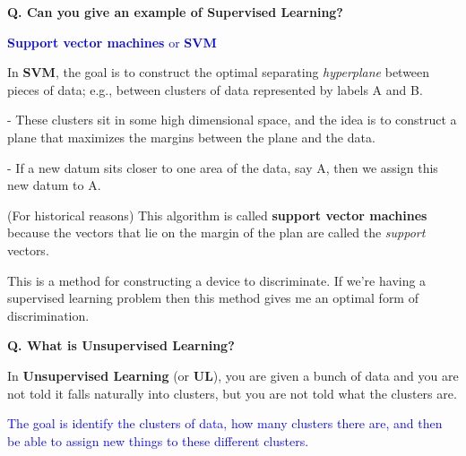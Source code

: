 \begin{frame}[fragile]{\textbf{Q. Can you give an example of Supervised Learning?}}
  \vspace{.4em}
  \begin{wideitemize}
    \item \textcolor{blue}{\textbf{Support vector machines} or \textbf{SVM}}
    \item In \textbf{SVM}, the goal is to construct the optimal separating
    \textit{hyperplane} between pieces of data; e.g., between clusters of data
    represented by labels A and B.\vspace{.4em}
    \begin{wideitemize}
      \item[-] These clusters sit in some high dimensional space, and the idea is to
      construct a plane that maximizes the margins between the plane and the data.
      \item[-] If a new datum sits closer to one area of the data, say A, then
      we assign this new datum to A.
    \end{wideitemize}
    \item (For historical reasons) This algorithm is called \textbf{support
    vector machines} because the vectors that lie on the margin of the plan are
    called the \textit{support} vectors.
  \end{wideitemize}

  \begin{framed}
  This is a method for constructing a device to discriminate. If we're having
  a supervised learning problem then this method gives me an optimal form of
  discrimination.
  \end{framed}

\end{frame}

\begin{frame}[fragile]{\textbf{Q. What is Unsupervised Learning?}}
  \begin{wideitemize}
    \item In \textbf{Unsupervised Learning} (or \textbf{UL}), you are given a
    bunch of data and you are not told it falls naturally into clusters, but
    you are not told what the clusters are.
    \item \textcolor{blue}{The goal is identify the clusters of data, how many clusters there are,
    and then be able to assign new things to these different clusters.}
  \end{wideitemize}
\end{frame}

